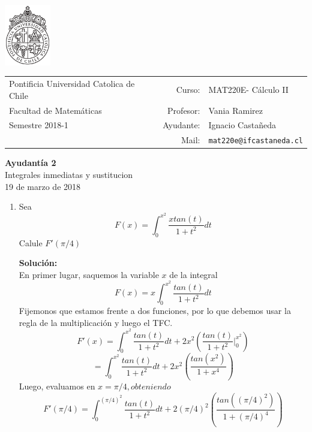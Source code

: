 \documentclass[12pt]{article}
\makeatletter
\newenvironment{solucion}
{\begin{mdframed}[backgroundcolor=black!10]
		{\bf Solución:}\\
	}
	{
	\end{mdframed}
}
\newenvironment{preguntas}
{\begin{enumerate}\itemsep12pt
	}
	{
	\end{enumerate}
}
\newcommand{\ayudantia}{{\sc Ayudantía 2}}
\newcommand{\tituloayu}{Integrales inmediatas y sustitucion}
\newcommand{\fecha}{19 de marzo de 2018}
\newcommand{\sigla}{MAT220E}
\newcommand{\nombre}{Cálculo II}
\newcommand{\profesor}{Vania Ramirez}
\newcommand{\ano}{2018}
\newcommand{\semestre}{1}
\newcommand{\mail}{mat220e@ifcastaneda.cl}
\newcommand{\ev}{\Big|}
\makeatother
\begin{document}
\thispagestyle{empty}

\begin{minipage}{2cm}
	\includegraphics[width=2cm]{../../../../img/logo.pdf}
	\vspace{0.5cm}
\end{minipage}
\begin{minipage}{\linewidth}
	\begin{tabular}{lrl}
		{\scriptsize\sc Pontificia Universidad Catolica de Chile} & \hspace*{0.7in}Curso: &
		\sigla  - \nombre\\
		{\sc Facultad de Matemáticas}&
		Profesor: & \profesor \\
		{\sc Semestre \ano-\semestre} & Ayudante: & {Ignacio Castañeda}\\
		& {Mail:} & \texttt{\mail}
	\end{tabular}
\end{minipage}

\vspace{-10mm}
\begin{center}
	{\LARGE\bf \ayudantia}\\
	\vspace{0.1cm}
	{\tituloayu}\\
	\vspace{0.1cm}
	\fecha\\
	\vspace{0.4cm}
\end{center}

\begin{preguntas}
\item Sea
$$F(x) = \displaystyle\int_0^{x^2} \dfrac{xtan(t)}{1+t^2}dt$$
	Calule $F'(\pi /4)$
\begin{solucion}
En primer lugar, saquemos la variable $x$ de la integral
		$$F(x) = x\displaystyle\int_0^{x^2} \dfrac{tan(t)}{1+t^2}dt$$
		Fijemonos que estamos frente a dos funciones, por lo que debemos usar la regla de la multiplicación y luego el TFC.
		$$F'(x) = \displaystyle\int_0^{x^2} \dfrac{tan(t)}{1+t^2}dt + 2x^2\left(\dfrac{tan(t)}{1+t^2}\ev_0^{x^2}\right)$$
		$$= \displaystyle\int_0^{x^2} \dfrac{tan(t)}{1+t^2}dt + 2x^2\left(\dfrac{tan(x^2)}{1+x^4}\right)$$
		Luego, evaluamos en $x = \pi /4, obteniendo$
		$$F'(\pi /4) = \displaystyle\int_0^{(\pi /4)^2} \dfrac{tan(t)}{1+t^2}dt + 2(\pi /4)^2\left(\dfrac{tan((\pi /4)^2)}{1+(\pi /4)^4}\right)$$
\end{solucion}
\end{preguntas}
\end{document}
